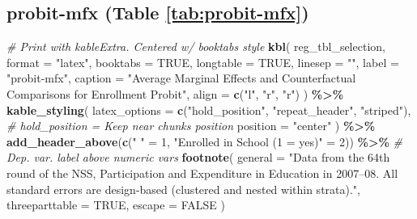 \documentclass[
]{article}
\newenvironment{Shaded}{\begin{snugshade}}{\end{snugshade}}
\newcommand{\AttributeTok}[1]{\textcolor[rgb]{0.13,0.29,0.53}{#1}}
\newcommand{\CommentTok}[1]{\textcolor[rgb]{0.56,0.35,0.01}{\textit{#1}}}
\newcommand{\ConstantTok}[1]{\textcolor[rgb]{0.56,0.35,0.01}{#1}}
\newcommand{\DecValTok}[1]{\textcolor[rgb]{0.00,0.00,0.81}{#1}}
\newcommand{\FunctionTok}[1]{\textcolor[rgb]{0.13,0.29,0.53}{\textbf{#1}}}
\newcommand{\NormalTok}[1]{#1}
\newcommand{\OtherTok}[1]{\textcolor[rgb]{0.56,0.35,0.01}{#1}}
\newcommand{\SpecialCharTok}[1]{\textcolor[rgb]{0.81,0.36,0.00}{\textbf{#1}}}
\newcommand{\StringTok}[1]{\textcolor[rgb]{0.31,0.60,0.02}{#1}}
\begin{document}
\subsection*{probit-mfx (Table \ref{tab:probit-mfx})}\label{probit-mfx-table-reftabprobit-mfx}

\begin{Shaded}
\begin{Highlighting}[]
\CommentTok{\# Print with kableExtra. Centered w/ booktabs style}
\FunctionTok{kbl}\NormalTok{(}
\NormalTok{  reg\_tbl\_selection,}
  \AttributeTok{format =} \StringTok{"latex"}\NormalTok{,}
  \AttributeTok{booktabs =} \ConstantTok{TRUE}\NormalTok{,}
  \AttributeTok{longtable =} \ConstantTok{TRUE}\NormalTok{,}
  \AttributeTok{linesep =} \StringTok{""}\NormalTok{,}
  \AttributeTok{label =} \StringTok{"probit{-}mfx"}\NormalTok{,}
  \AttributeTok{caption =} \StringTok{"Average Marginal Effects and Counterfactual Comparisons for Enrollment Probit"}\NormalTok{,}
  \AttributeTok{align =} \FunctionTok{c}\NormalTok{(}\StringTok{"l"}\NormalTok{, }\StringTok{"r"}\NormalTok{, }\StringTok{"r"}\NormalTok{)}
\NormalTok{) }\SpecialCharTok{\%\textgreater{}\%}
  \FunctionTok{kable\_styling}\NormalTok{(}
    \AttributeTok{latex\_options =} \FunctionTok{c}\NormalTok{(}\StringTok{"hold\_position"}\NormalTok{, }\StringTok{"repeat\_header"}\NormalTok{, }\StringTok{"striped"}\NormalTok{), }\CommentTok{\# hold\_position = Keep near chunk\textquotesingle{}s position}
    \AttributeTok{position =} \StringTok{"center"}
\NormalTok{  ) }\SpecialCharTok{\%\textgreater{}\%}
  \FunctionTok{add\_header\_above}\NormalTok{(}\FunctionTok{c}\NormalTok{(}\StringTok{" "} \OtherTok{=} \DecValTok{1}\NormalTok{, }\StringTok{"Enrolled in School (1 = yes)"} \OtherTok{=} \DecValTok{2}\NormalTok{)) }\SpecialCharTok{\%\textgreater{}\%} \CommentTok{\# Dep. var. label above numeric vars}
  \FunctionTok{footnote}\NormalTok{(}
    \AttributeTok{general =} \StringTok{"Data from the 64th round of the NSS, \textasciigrave{}\textasciigrave{}Participation and Expenditure in Education\textquotesingle{}\textquotesingle{} in 2007–08. All standard errors are design{-}based (clustered and nested within strata)."}\NormalTok{,}
    \AttributeTok{threeparttable =} \ConstantTok{TRUE}\NormalTok{,}
    \AttributeTok{escape =} \ConstantTok{FALSE}
\NormalTok{  )}
\end{Highlighting}
\end{Shaded}
\end{document}
